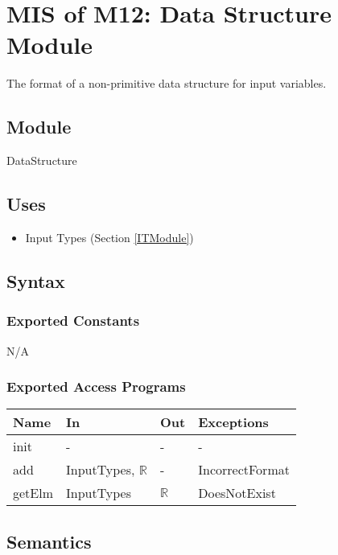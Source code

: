 \documentclass[12pt, titlepage]{article}
\begin{document}
\newpage

\section{MIS of M12: Data Structure Module} \label{DSModule} 

The format of a non-primitive data structure for input variables.

\subsection{Module}

DataStructure

\subsection{Uses}
\begin{itemize}
	\item Input Types (Section \ref{ITModule})
\end{itemize}

\subsection{Syntax}

\subsubsection{Exported Constants}
N/A

\subsubsection{Exported Access Programs}

\begin{center}
	\begin{tabular}{p{2cm} p{4cm} p{4cm} p{2cm}}
		\hline
		\textbf{Name} & \textbf{In} & \textbf{Out} & \textbf{Exceptions} \\
		\hline
		init & - & - & - \\
		add & InputTypes, $\mathbb{R}$ & - & IncorrectFormat \\
		getElm &InputTypes & $\mathbb{R}$ & DoesNotExist \\
		\hline
	\end{tabular}
\end{center}

\subsection{Semantics}
\end{document}
